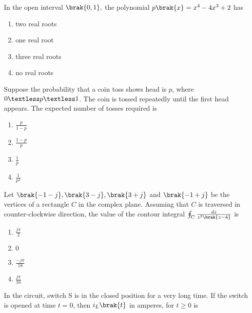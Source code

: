 {{\begin{figure}[H]
\label{fig:my_label}
\end{figure}
}
\item{
In the open interval $\brak{0,1},$ the polynomial $p\brak{x}=x^4-4x^3+2$ has 
\begin{multicols}{4}
\begin{enumerate}
\item two real roots
\item one real root
\item three real roots
\item no real roots
\end{enumerate}
\end{multicols}
}
\item{
Suppose the probability that a coin toss shows head is $p$, where $0\textless p\textless 1$. The coin is tossed repeatedly until the first head appears. The expected number of tosses required is
\begin{multicols}{4}
\begin{enumerate}
\item $\frac{p}{1-p}$
\item $\frac{1-p}{p}$
\item $\frac{1}{p}$
\item $\frac{1}{p^2}$
\end{enumerate}
\end{multicols}
}
\item{
Let $\brak{-1-j},\brak{3-j},\brak{3+j}$ and $\brak{-1+j}$ be the vertices of a rectangle $C$ in the complex plane. Assuming that $C$ is traversed in counter-clockwise direction, the value of the contour integral $\oint_C\frac{dz}{z^2\brak{z-4}}$ is
\begin{multicols}{4}
\begin{enumerate}
\item $\frac{j\pi}{2}$
\item $0$
\item $\frac{-j\pi}{18}$
\item $\frac{j\pi}{16}$
\end{enumerate}
\end{multicols}
}
\item{
In the circuit, switch S is in the closed position for a very long time. If the switch is opened at time $t=0$, then $i_L\brak{t}$ in amperes, for $t\geq 0$ is
\begin{figure}[H]
\centering
{}
\end{figure}}}
